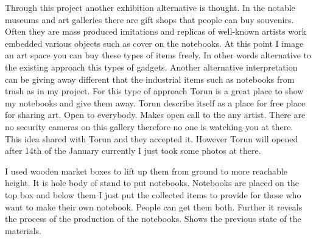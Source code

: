 


Through this project another exhibition alternative is thought. In the notable museums and art galleries there are gift shops that people can buy souvenirs. Often they are mass produced imitations and replicas of well-known artists work embedded various objects such as cover on the notebooks. At this point I image an art space you can buy these types of items freely. In other words alternative to the existing approach this types of gadgets. Another alternative interpretation can be giving away different that the industrial items such as notebooks from trash as in my project. For this type of approach Torun is a great place to show my notebooks and give them away. Torun describe itself as a place for free place for sharing art. Open to everybody. Makes open call to the any artist. There are no security cameras on this gallery therefore no one is watching you at there. This idea shared with Torun and they accepted it. However Torun will opened after 14th of the January currently I just took some photos at there.

I used wooden market boxes to lift up them from ground to more reachable height. It is hole body of stand to put notebooks. Notebooks are placed on the top box and below them I just put the collected items to provide for those who want to make their own notebook. People can get them both. Further it reveals the process of the production of the notebooks. Shows the previous state of the materials.

